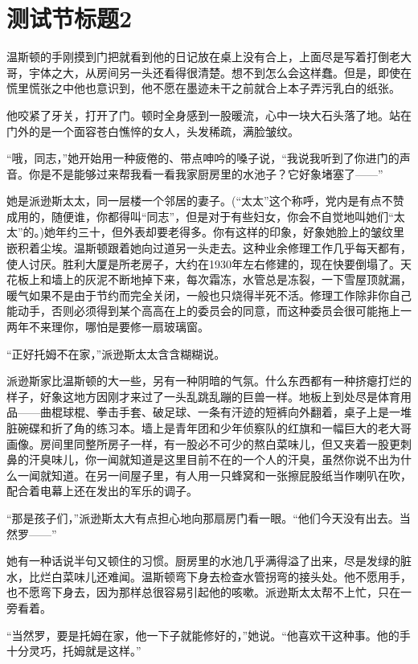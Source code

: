 \section{测试节标题2}


温斯顿的手刚摸到门把就看到他的日记放在桌上没有合上，上面尽是写着打倒老大哥，宇体之大，从房间另一头还看得很清楚。想不到怎么会这样蠢。但是，即使在慌里慌张之中他也意识到，他不愿在墨迹未干之前就合上本子弄污乳白的纸张。


他咬紧了牙关，打开了门。顿时全身感到一股暖流，心中一块大石头落了地。站在门外的是一个面容苍白憔悴的女人，头发稀疏，满脸皱纹。


“哦，同志，”她开始用一种疲倦的、带点呻吟的嗓子说，“我说我听到了你进门的声音。你是不是能够过来帮我看一看我家厨房里的水池子？它好象堵塞了——”


她是派逊斯太太，同一层楼一个邻居的妻子。(“太太”这个称呼，党内是有点不赞成用的，随便谁，你都得叫“同志”，但是对于有些妇女，你会不自觉地叫她们“太太”的。)她年约三十，但外表却要老得多。你有这样的印象，好象她脸上的皱纹里嵌积着尘埃。温斯顿跟着她向过道另一头走去。这种业余修理工作几乎每天都有，使人讨厌。胜利大厦是所老房子，大约在1930年左右修建的，现在快要倒塌了。天花板上和墙上的灰泥不断地掉下来，每次霜冻，水管总是冻裂，一下雪屋顶就漏，暖气如果不是由于节约而完全关闭，一般也只烧得半死不活。修理工作除非你自己能动手，否则必须得到某个高高在上的委员会的同意，而这种委员会很可能拖上一两年不来理你，哪怕是要修一扇玻璃窗。


“正好托姆不在家，”派逊斯太太含含糊糊说。


派逊斯家比温斯顿的大一些，另有一种阴暗的气氛。什么东西都有一种挤瘪打烂的样子，好象这地方因刚才来过了一头乱跳乱蹦的巨兽一样。地板上到处尽是体育用品——曲棍球棍、拳击手套、破足球、一条有汗迹的短裤向外翻着，桌子上是一堆脏碗碟和折了角的练习本。墙上是青年团和少年侦察队的红旗和一幅巨大的老大哥画像。房间里同整所房子一样，有一股必不可少的熬白菜味儿，但又夹着一股更刺鼻的汗臭味儿，你一闻就知道是这里目前不在的一个人的汗臭，虽然你说不出为什么一闻就知道。在另一间屋子里，有人用一只蜂窝和一张擦屁股纸当作喇叭在吹，配合着电幕上还在发出的军乐的调子。


“那是孩子们，”派逊斯太大有点担心地向那扇房门看一眼。“他们今天没有出去。当然罗——”


她有一种话说半句又顿住的习惯。厨房里的水池几乎满得溢了出来，尽是发绿的脏水，比烂白菜味儿还难闻。温斯顿弯下身去检查水管拐弯的接头处。他不愿用手，也不愿弯下身去，因为那样总很容易引起他的咳嗽。派逊斯太太帮不上忙，只在一旁看着。


“当然罗，要是托姆在家，他一下子就能修好的，”她说。“他喜欢干这种事。他的手十分灵巧，托姆就是这样。”


